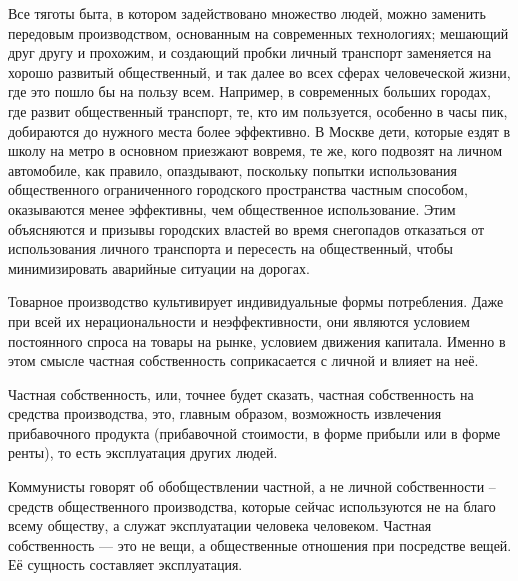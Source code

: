 \documentclass[../main]{subfiles}
\begin{document}
Все тяготы быта, в котором задействовано множество людей, можно заменить передовым производством, основанным на современных технологиях; мешающий друг другу и прохожим, и создающий пробки личный транспорт заменяется на хорошо развитый общественный, и так далее во всех сферах человеческой жизни, где это пошло бы на пользу всем. Например, в современных больших городах, где развит общественный транспорт, те, кто им пользуется, особенно в часы пик, добираются до нужного места более эффективно. В Москве дети, которые ездят в школу на метро в основном приезжают вовремя, те же, кого подвозят на личном автомобиле, как правило, опаздывают, поскольку попытки использования общественного ограниченного городского пространства частным способом, оказываются менее эффективны, чем общественное использование. Этим объясняются и призывы городских властей во время снегопадов отказаться от использования личного транспорта и пересесть на общественный, чтобы минимизировать аварийные ситуации на дорогах.

Товарное производство культивирует индивидуальные формы потребления. Даже при всей их нерациональности и неэффективности, они являются условием постоянного спроса на товары на рынке, условием движения капитала. Именно в этом смысле частная собственность соприкасается с личной и влияет на неё.

Частная собственность, или, точнее будет сказать, частная собственность на средства производства, это, главным образом, возможность извлечения прибавочного продукта (прибавочной стоимости, в форме прибыли или в форме ренты), то есть эксплуатация других людей.

Коммунисты говорят об обобществлении частной, а не личной собственности – средств общественного производства, которые сейчас используются не на благо всему обществу, а служат эксплуатации человека человеком. Частная собственность — это не вещи, а общественные отношения при посредстве вещей. Её сущность составляет эксплуатация.
\end{document}
